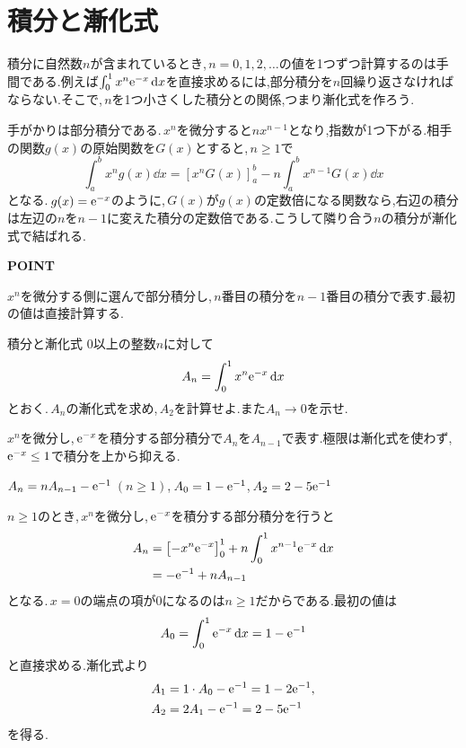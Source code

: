 \section{積分と漸化式}\label{節:積分漸化式}

積分に自然数$n$が含まれているとき,\,$n=0,1,2,\ldots$の値を1つずつ計算するのは手間である.例えば$\int_0^1x^n\mathrm{e}^{-x}\,\mathrm{d} x$を直接求めるには,部分積分を$n$回繰り返さなければならない.そこで,\,$n$を1つ小さくした積分との関係,つまり漸化式を作ろう.

手がかりは部分積分である.\,$x^n$を微分すると$nx^{n-1}$となり,指数が1つ下がる.相手の関数$g(x)$の原始関数を$G(x)$とすると,\,$n\ge1$で
\[
 \int_a^b x^ng(x)\dd x
 =\left[x^nG(x)\right]_a^b
 -n\int_a^b x^{n-1}G(x)\dd x
\]
となる.\,$g(x)=\mathrm{e}^{-x}$のように,\,$G(x)$が$g(x)$の定数倍になる関数なら,右辺の積分は左辺の$n$を$n-1$に変えた積分の定数倍である.こうして隣り合う$n$の積分が漸化式で結ばれる.

\begin{bookpoint}
\textbf{POINT}\par
$x^n$を微分する側に選んで部分積分し,\,$n$番目の積分を$n-1$番目の積分で表す.最初の値は直接計算する.
\end{bookpoint}

\begin{example}{積分と漸化式}
0以上の整数$n$に対して
\[
 A_n=\int_0^1 x^n\mathrm{e}^{-x}\,\mathrm{d} x
\]
とおく.\,$A_n$の漸化式を求め,\,$A_2$を計算せよ.また$A_n\to0$を示せ.
\end{example}

$x^n$を微分し,\,$\mathrm{e}^{-x}$を積分する部分積分で$A_n$を$A_{n-1}$で表す.極限は漸化式を使わず,\,$\mathrm{e}^{-x}\le1$で積分を上から抑える.

$A_n=nA_{n-1}-\mathrm{e}^{-1}$\,$(n\ge1)$,\,$A_0=1-\mathrm{e}^{-1}$,\,$A_2=2-5\mathrm{e}^{-1}$

$n\ge1$のとき,\,$x^n$を微分し,\,$\mathrm{e}^{-x}$を積分する部分積分を行うと
\begin{align*}
 A_n
 &=\left[-x^n\mathrm{e}^{-x}\right]_0^1
   +n\int_0^1x^{n-1}\mathrm{e}^{-x}\,\mathrm{d} x\\
 &=-\mathrm{e}^{-1}+nA_{n-1}
\end{align*}
となる.\,$x=0$の端点の項が$0$になるのは$n\ge1$だからである.最初の値は
\[
 A_0=\int_0^1\mathrm{e}^{-x}\,\mathrm{d} x=1-\mathrm{e}^{-1}
\]
と直接求める.漸化式より
\begin{align*}
 A_1&=1\cdot A_0-\mathrm{e}^{-1}=1-2\mathrm{e}^{-1},\\
 A_2&=2A_1-\mathrm{e}^{-1}=2-5\mathrm{e}^{-1}
\end{align*}
を得る.

